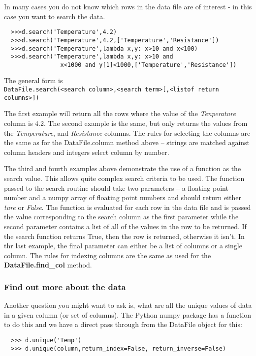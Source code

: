 \documentclass[a4paper,11pt]{scrartcl}
\begin{document}
In many cases you do not know which rows in the data file are of interest - in
this case you want to search the data.
\begin{verbatim}
  >>>d.search('Temperature',4.2)
  >>>d.search('Temperature',4.2,['Temperature','Resistance'])
  >>>d.search('Temperature',lambda x,y: x>10 and x<100)
  >>>d.search('Temperature',lambda x,y: x>10 and
                x<1000 and y[1]<1000,['Temperature','Resistance'])
\end{verbatim}
The general form is \\\verb:DataFile.search(<search column>,<search term>[,<listof return columns>]):

The first example will return all the rows where the value of the
\textit{Tenperature} column is 4.2. The second example is the same, but only
returns the values from the \textit{Temperature}, and \textit{Resistance}
columns. The rules for selecting the columns are the same as for the
DataFile.column method above -- strings are matched against column headers and
integers select column by number.

The third and fourth examples above demonstrate the use of a function as the
search value. This allows quite complex search criteria to be used. The function
passed to the search routine should take two parameters -- a floating point
number and a numpy array of floating point numbers and should return either
\textit{ture} or \textit{False}. The function is evaluated for each row in the
data file and is passed the value corresponding to the search column as the
first parameter while the second parameter contains a list of all of the values
in the row to be returned. If the search function returns True, then the row is
returned, otherwise it isn't. In thr last example, the final parameter can
either be a list of columns or a single column. The rules for indexing columns
are the same as used for the \textbf{DataFile.find\_col} method.

\subsubsection{Find out more about the data}

Another question you might want to ask is, what are all the unique
values of data in a given column (or set of columns). The Python numpy
package has a function to do this and we have a direct pass through
from the DataFile object for this:

\begin{verbatim}
  >>> d.unique('Temp')
  >>> d.unique(column,return_index=False, return_inverse=False)
\end{verbatim}
\end{document}
